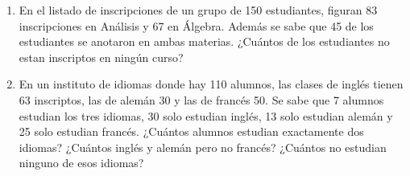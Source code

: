 \begin{enunciado}{\ejercicio}
  \begin{enumerate}[label=\alph*)]
    \item  En el listado de inscripciones de un grupo de 150 estudiantes, figuran 83 inscripciones en Análisis y 67 en Álgebra. Además se
          sabe que 45 de los estudiantes se anotaron en ambas materias.
          ¿Cuántos de los estudiantes no estan inscriptos en ningún curso?

    \item  En un instituto de idiomas donde hay 110 alumnos, las clases de inglés tienen 63 inscriptos, las de alemán 30 y las de francés
          50. Se sabe que 7 alumnos estudian los tres idiomas, 30 solo estudian inglés, 13 solo estudian alemán y 25 solo estudian francés.
          ¿Cuántos alumnos estudian exactamente dos idiomas?
          ¿Cuántos inglés y alemán pero no francés? ¿Cuántos no estudian ninguno de esos idiomas?
  \end{enumerate}
\end{enunciado}

